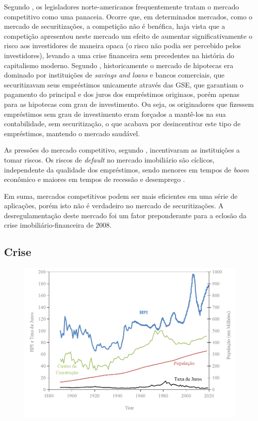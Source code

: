 \documentclass[
	12pt,				%
	oneside,			%
	a4paper,			%
	chapter=TITLE,		%
	section=TITLE,		%
	english,			%
	brazil				%
	]{abntex2}
\begin{document}
\begin{refsection}
Segundo \textcite[p.~213]{simkovic}, os legisladores norte-americanos frequentemente
tratam o mercado competitivo como uma panaceia. Ocorre que, em determinados
mercados, como o mercado de securitizações, a competição não é benéfica, haja
vista que a competição apresentou neste mercado um efeito de aumentar
significativamente o risco aos investidores de maneira opaca (o risco não podia
ser percebido pelos investidores), levando a uma crise financeira sem
precedentes na história do capitalismo moderno. Segundo \textcite{levitin2009},
historicamente o mercado de hipotecas era dominado por instituições de \emph{savings
and loans} e bancos comerciais, que securitizavam seus empréstimos unicamente
através das \gls{GSE}, que garantiam o pagamento do principal e dos juros dos
empréstimos originaos, porém apenas para as hipotecas com grau de investimento.
Ou seja, os originadores que fizessem empréstimos sem grau de investimento eram
forçados a mantê-los na sua contabilidade, sem securitização, o que acabava por
desincentivar este tipo de empréstimos, mantendo o mercado saudável.

As pressões do mercado competitivo, segundo \textcite[p.~216]{simkovic}, incentivaram as
instituições a tomar riscos. Os riscos de \emph{default} no mercado imobiliário são
cíclicos, independente da qualidade dos empréstimos, sendo menores em tempos de
\emph{boom} econômico e maiores em tempos de recessão e desemprego \autocite[ p.~228]{simkovic}.

Em suma, mercados competitivos podem ser mais eficientes em uma série de
aplicações, porém isto não é verdadeiro no mercado de securitizações. A
desregulamentação deste mercado foi um fator preponderante para a eclosão da
crise imobiliário-financeira de 2008.

\hypertarget{crise}{%
\subsection{Crise}\label{crise}}
\begin{figure}[H]

{\centering \includegraphics[width=0.7\linewidth]{images/shiller} 

}
\end{figure}
\end{refsection}
\end{document}

